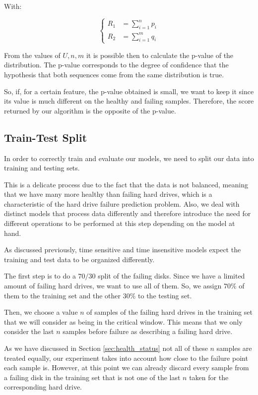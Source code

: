With:

\begin{equation}
  \begin{cases}
    R_1 &= \sum_{i=1}^{n}p_i \\
    R_2 &= \sum_{i=1}^{m}q_i
  \end{cases}
\end{equation}

From the values of $U, n, m$ it is possible then to calculate the p-value of the distribution.
The p-value corresponds to the degree of confidence that the hypothesis that both sequences come from the same distribution is true.

So, if, for a certain feature, the p-value obtained is small, we want to keep it since its value is much different on the healthy and failing samples.
Therefore, the score returned by our algorithm is the opposite of the p-value.

\subsection{Train-Test Split}\label{subsec:train_test_split}

In order to correctly train and evaluate our models, we need to split our data into training and testing sets.

This is a delicate process due to the fact that the data is not balanced, meaning that we have many more healthy than failing hard drives, which is a characteristic of the hard drive failure prediction problem.
Also, we deal with distinct models that process data differently and therefore introduce the need for different operations to be performed at this step depending on the model at hand.

As discussed previously, time sensitive and time insensitive models expect the training and test data to be organized differently.

The first step is to do a $70/30$ split of the failing disks.
Since we have a limited amount of failing hard drives, we want to use all of them.
So, we assign $70\%$ of them to the training set and the other $30\%$ to the testing set.

Then, we choose a value $n$ of samples of the failing hard drives in the training set that we will consider as being in the critical window.
This means that we only consider the last $n$ samples before failure as describing a failing hard drive.

As we have discussed in Section \ref{sec:health_status} not all of these $n$ samples are treated equally, our experiment takes into account how close to the failure point each sample is.
However, at this point we can already discard every sample from a failing disk in the training set that is not one of the last $n$ taken for the corresponding hard drive.

